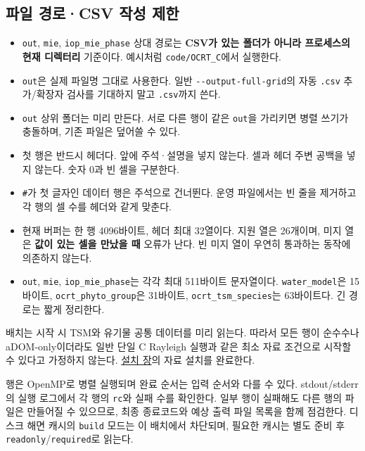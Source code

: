 \subsection{파일 경로·CSV 작성 제한}
\label{sec:auto:08_input_formats:2.6}
\begin{itemize}
\item \texttt{out}, \texttt{mie}, \texttt{iop\_\allowbreak{}mie\_\allowbreak{}phase} 상대 경로는 \textbf{CSV가 있는 폴더가 아니라 프로세스의 현재 디렉터리} 기준이다. 예시처럼 \texttt{code/\allowbreak{}OCRT\_\allowbreak{}C}에서 실행한다.
\item \texttt{out}은 실제 파일명 그대로 사용한다. 일반 \texttt{-\allowbreak{}-\allowbreak{}output-\allowbreak{}full-\allowbreak{}grid}의 자동 \texttt{.\allowbreak{}csv} 추가/확장자 검사를 기대하지 말고 \texttt{.\allowbreak{}csv}까지 쓴다.
\item \texttt{out} 상위 폴더는 미리 만든다. 서로 다른 행이 같은 \texttt{out}을 가리키면 병렬 쓰기가 충돌하며, 기존 파일은 덮어쓸 수 있다.
\item 첫 행은 반드시 헤더다. 앞에 주석·설명을 넣지 않는다. 셀과 헤더 주변 공백을 넣지 않는다. 숫자 0과 빈 셀을 구분한다.
\item \texttt{\#}가 첫 글자인 데이터 행은 주석으로 건너뛴다. 운영 파일에서는 빈 줄을 제거하고 각 행의 셀 수를 헤더와 같게 맞춘다.
\item 현재 버퍼는 한 행 4096바이트, 헤더 최대 32열이다. 지원 열은 26개이며, 미지 열은 \textbf{값이 있는 셀을 만났을 때} 오류가 난다. 빈 미지 열이 우연히 통과하는 동작에 의존하지 않는다.
\item \texttt{out}, \texttt{mie}, \texttt{iop\_\allowbreak{}mie\_\allowbreak{}phase}는 각각 최대 511바이트 문자열이다. \texttt{water\_\allowbreak{}model}은 15바이트, \texttt{ocrt\_\allowbreak{}phyto\_\allowbreak{}group}은 31바이트, \texttt{ocrt\_\allowbreak{}tsm\_\allowbreak{}species}는 63바이트다. 긴 경로는 짧게 정리한다.
\end{itemize}

배치는 시작 시 TSM와 유기물 공통 데이터를 미리 읽는다. 따라서 모든 행이 순수수나 aDOM-only이더라도 일반 단일 C Rayleigh 실행과 같은 최소 자료 조건으로 시작할 수 있다고 가정하지 않는다. \hyperref[chap:02_installation]{설치 장}의 자료 설치를 완료한다.

행은 OpenMP로 병렬 실행되며 완료 순서는 입력 순서와 다를 수 있다. stdout/stderr의 실행 로그에서 각 행의 \texttt{rc}와 실패 수를 확인한다. 일부 행이 실패해도 다른 행의 파일은 만들어질 수 있으므로, 최종 종료코드와 예상 출력 파일 목록을 함께 점검한다. 디스크 해면 캐시의 \texttt{build} 모드는 이 배치에서 차단되며, 필요한 캐시는 별도 준비 후 \texttt{readonly}/\texttt{required}로 읽는다.

